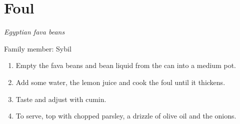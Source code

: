 \chapter{Foul}
\label{ch:foul}
\textit{Egyptian fava beans}

Family member: Sybil



\begin{enumerate}
    \item Empty the fava beans and bean liquid from the can into a medium pot.
    \item Add some water, the lemon juice and cook the foul until it thickens.
    \item Taste and adjust with cumin.
    \item To serve, top with chopped parsley, a drizzle of olive oil and the onions.
\end{enumerate}

